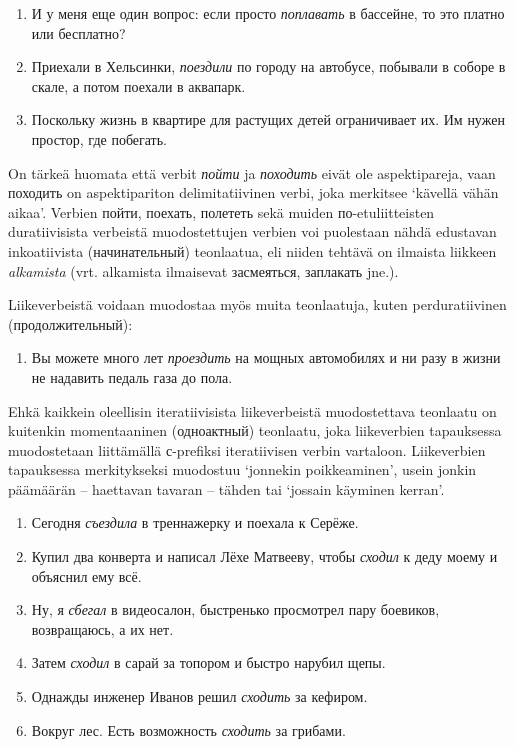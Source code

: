 \documentclass[]{scrreprt}
\providecommand{\tightlist}{%
  \setlength{\itemsep}{0pt}\setlength{\parskip}{0pt}}
\begin{document}
\begin{enumerate}
\def\labelenumi{(\arabic{enumi})}
\setcounter{enumi}{446}
\tightlist
\item
  И у меня еще один вопрос: если просто \emph{поплавать} в бассейне, то
  это платно или бесплатно?
\item
  Приехали в Хельсинки, \emph{поездили} по городу на автобусе, побывали
  в соборе в скале, а потом поехали в аквапарк.
\item
  Поскольку жизнь в квартире для растущих детей ограничивает их. Им
  нужен простор, где побегать.
\end{enumerate}

On tärkeä huomata että verbit \emph{пойти} ja \emph{походить} eivät ole
aspektipareja, vaan походить on aspektipariton delimitatiivinen verbi,
joka merkitsee `kävellä vähän aikaa'. Verbien пойти, поехать, полететь
sekä muiden по-etuliitteisten duratiivisista verbeistä muodostettujen
verbien voi puolestaan nähdä edustavan inkoatiivista (начинательный)
teonlaatua, eli niiden tehtävä on ilmaista liikkeen \emph{alkamista}
(vrt. alkamista ilmaisevat засмеяться, заплакать jne.).

Liikeverbeistä voidaan muodostaa myös muita teonlaatuja, kuten
perduratiivinen (продолжительный):

\begin{enumerate}
\def\labelenumi{(\arabic{enumi})}
\setcounter{enumi}{449}
\tightlist
\item
  Вы можете много лет \emph{проездить} на мощных автомобилях и ни разу в
  жизни не надавить педаль газа до пола.
\end{enumerate}

Ehkä kaikkein oleellisin iteratiivisista liikeverbeistä muodostettava
teonlaatu on kuitenkin momentaaninen (одноактный) teonlaatu, joka
liikeverbien tapauksessa muodostetaan liittämällä с-prefiksi
iteratiivisen verbin vartaloon. Liikeverbien tapauksessa merkitykseksi
muodostuu `jonnekin poikkeaminen', usein jonkin päämäärän -- haettavan
tavaran -- tähden tai `jossain käyminen kerran'.

\begin{enumerate}
\def\labelenumi{(\arabic{enumi})}
\setcounter{enumi}{450}
\tightlist
\item
  Сегодня \emph{съездила} в треннажерку и поехала к Серёже.
\item
  Купил два конверта и написал Лёхе Матвееву, чтобы \emph{сходил} к деду
  моему и объяснил ему всё.
\item
  Ну, я \emph{сбегал} в видеосалон, быстренько просмотрел пару боевиков,
  возвращаюсь, а их нет.
\item
  Затем \emph{сходил} в сарай за топором и быстро нарубил щепы.
\item
  Однажды инженер Иванов решил \emph{сходить} за кефиром.
\item
  Вокруг лес. Есть возможность \emph{сходить} за грибами.
\end{enumerate}
\end{document}
